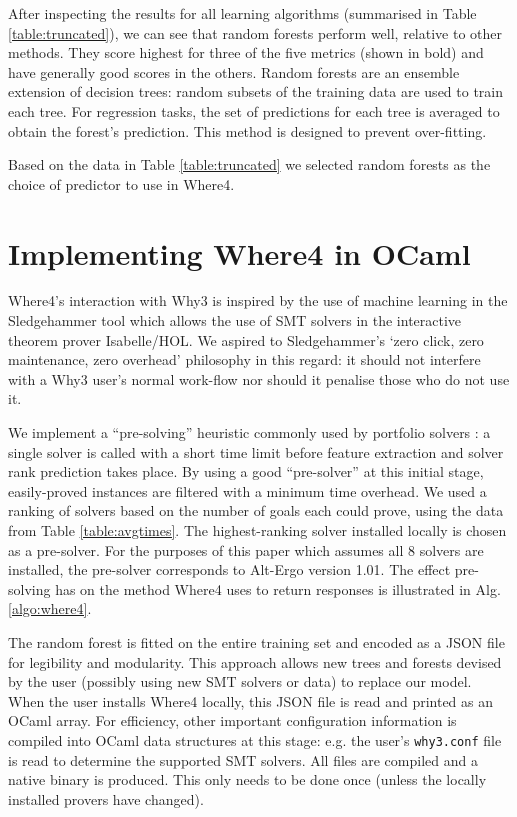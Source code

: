 \documentclass[submission,copyright,creativecommons]{eptcs}
\begin{document}
After inspecting the results for all learning algorithms (summarised in Table \ref{table:truncated}), we can see that random forests \cite{RandomForests} perform well, relative to other methods. They score highest for three of the five metrics (shown in bold) and have generally good scores in the others. Random forests are an ensemble extension of decision trees: random subsets of the training data are used to train each tree. For regression tasks, the set of predictions for each tree is averaged to obtain the forest's prediction. This method is designed to prevent over-fitting. 

Based on the data in Table \ref{table:truncated} we selected random forests as the choice of predictor to use in \textsf{Where4}.   



\section{Implementing \textsf{Where4} in OCaml}

\textsf{Where4}'s interaction with \textsf{Why3} is inspired by the use of machine learning in the Sledgehammer tool \cite{Sledgehammer} which allows the use of SMT solvers in the interactive theorem prover Isabelle/HOL. We aspired to Sledgehammer's `zero click, zero maintenance, zero overhead' philosophy in this regard: it should not interfere with a \textsf{Why3} user's normal work-flow nor should it penalise those who do not use it. 

We implement a ``pre-solving'' heuristic commonly used by portfolio solvers \cite{sunny-cp}\cite{Satzilla}: a single solver is called with a short time limit before feature extraction and solver rank prediction takes place. 
By using a good ``pre-solver'' at this initial stage, easily-proved instances are filtered with a minimum time overhead. We used a ranking of solvers based on the number of goals each could prove, using the data from Table \ref{table:avgtimes}.
The highest-ranking solver installed locally is chosen as a pre-solver. For the purposes of this paper which assumes all 8 solvers are installed, the pre-solver corresponds to Alt-Ergo version 1.01.
The effect pre-solving has on the method \textsf{Where4} uses to return responses is illustrated in Alg. \ref{algo:where4}.      

The random forest is fitted on the entire training set and encoded as a JSON file for legibility and modularity. This approach allows new trees and forests devised by the user (possibly using new SMT solvers or data) to replace our model.  When the user installs \textsf{Where4} locally, this JSON file is read and printed as an OCaml array. For efficiency, other important configuration information is compiled into OCaml data structures at this stage: e.g. the user's \texttt{why3.conf} file is read to determine the supported SMT solvers. All files are compiled and a native binary is produced. This only needs to be done once (unless the locally installed provers have changed). 
\end{document}
